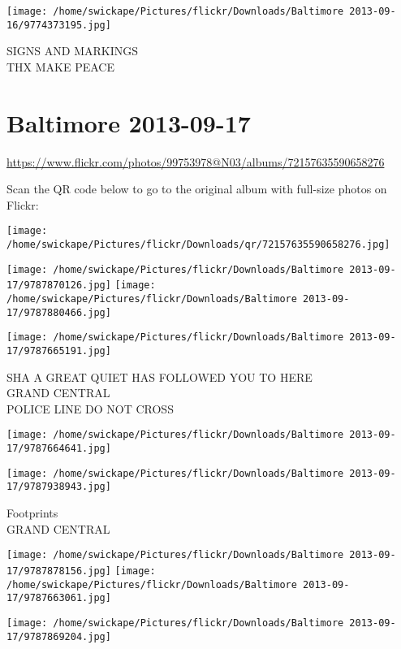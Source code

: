 \documentclass[10pt,letterpaper]{article}
\begin{document}
\vspace{0.25in}
\texttt{[image: /home/swickape/Pictures/flickr/Downloads/Baltimore 2013-09-16/9774373195.jpg]}

SIGNS AND MARKINGS\\
THX MAKE PEACE
\pagebreak

\section*{Baltimore 2013-09-17}

\url{https://www.flickr.com/photos/99753978@N03/albums/72157635590658276}

Scan the QR code below to go to the original album with full-size photos on Flickr:

\texttt{[image: /home/swickape/Pictures/flickr/Downloads/qr/72157635590658276.jpg]}
\pagebreak

\texttt{[image: /home/swickape/Pictures/flickr/Downloads/Baltimore 2013-09-17/9787870126.jpg]}
\texttt{[image: /home/swickape/Pictures/flickr/Downloads/Baltimore 2013-09-17/9787880466.jpg]}

\vspace{0.25in}
\texttt{[image: /home/swickape/Pictures/flickr/Downloads/Baltimore 2013-09-17/9787665191.jpg]}

SHA A GREAT QUIET HAS FOLLOWED YOU TO HERE\\
GRAND CENTRAL\\
POLICE LINE DO NOT CROSS
\pagebreak

\texttt{[image: /home/swickape/Pictures/flickr/Downloads/Baltimore 2013-09-17/9787664641.jpg]}

\vspace{0.25in}
\texttt{[image: /home/swickape/Pictures/flickr/Downloads/Baltimore 2013-09-17/9787938943.jpg]}

Footprints\\
GRAND CENTRAL
\pagebreak

\texttt{[image: /home/swickape/Pictures/flickr/Downloads/Baltimore 2013-09-17/9787878156.jpg]}
\texttt{[image: /home/swickape/Pictures/flickr/Downloads/Baltimore 2013-09-17/9787663061.jpg]}

\vspace{0.25in}
\texttt{[image: /home/swickape/Pictures/flickr/Downloads/Baltimore 2013-09-17/9787869204.jpg]}
\end{document}
